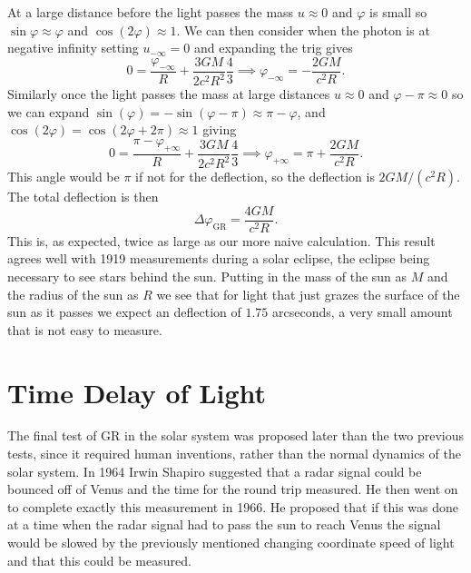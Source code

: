 \documentclass[fleqn]{NotesClass}
\begin{document}
    At a large distance before the light passes the mass \(u \approx 0\) and \(\varphi\) is small so \(\sin\varphi \approx \varphi\) and \(\cos(2\varphi) \approx 1\).
    We can then consider when the photon is at negative infinity setting \(u_{-\infty} = 0\) and expanding the trig gives
    \begin{equation}
        0 = \frac{\varphi_{-\infty}}{R} + \frac{3GM}{2c^2R^2} \frac{4}{3} \implies \varphi_{-\infty} = -\frac{2GM}{c^2R}.
    \end{equation}
    Similarly once the light passes the mass at large distances \(u \approx 0\) and \(\varphi - \pi \approx 0\) so we can expand \(\sin(\varphi) = -\sin(\varphi - \pi) \approx \pi - \varphi\), and \(\cos(2\varphi) = \cos(2\varphi + 2\pi) \approx 1\) giving
    \begin{equation}
        0 = \frac{\pi - \varphi_{+\infty}}{R} + \frac{3GM}{2c^2R^2} \frac{4}{3} \implies \varphi_{+\infty} = \pi + \frac{2GM}{c^2R}.
    \end{equation}
    This angle would be \(\pi\) if not for the deflection, so the deflection is \(2GM/(c^2R)\).
    The total deflection is then
    \begin{equation}
        \Delta \varphi_{\mathrm{GR}} = \frac{4GM}{c^2R}.
    \end{equation}
    This is, as expected, twice as large as our more naive calculation.
    This result agrees well with 1919 measurements during a solar eclipse, the eclipse being necessary to see stars behind the sun.
    Putting in the mass of the sun as \(M\) and the radius of the sun as \(R\) we see that for light that just grazes the surface of the sun as it passes we expect an deflection of \(1.75\) arcseconds, a very small amount that is not easy to measure.
    
    \section{Time Delay of Light}
    The final test of GR in the solar system was proposed later than the two previous tests, since it required human inventions, rather than the normal dynamics of the solar system.
    In 1964 Irwin Shapiro suggested that a radar signal could be bounced off of Venus and the time for the round trip measured.
    He then went on to complete exactly this measurement in 1966.
    He proposed that if this was done at a time when the radar signal had to pass the sun to reach Venus the signal would be slowed by the previously mentioned changing coordinate speed of light and that this could be measured.
    
\end{document}
